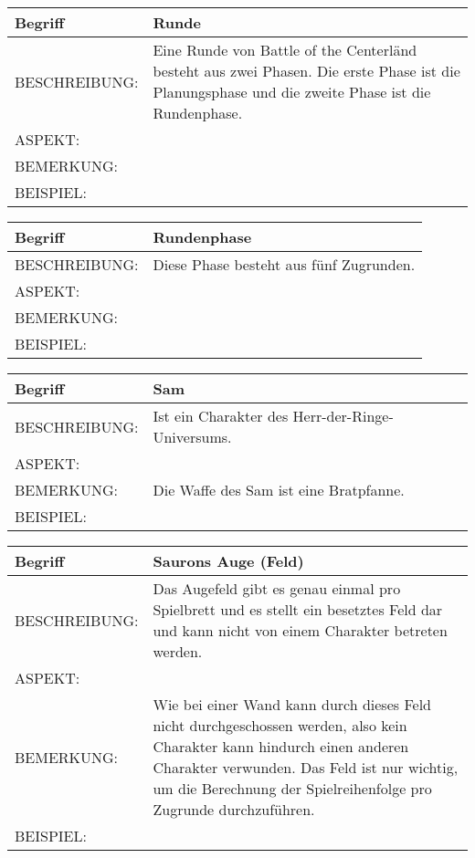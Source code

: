 \documentclass{uulm-assignment}
\begin{document}
	     \begin{tabularx}{\textwidth}{|l|X |} \hline
	        \textbf{Begriff} & \textbf{Runde} \\
	        \hline
	        BESCHREIBUNG: & Eine Runde von Battle of the Centerländ besteht aus zwei Phasen. Die erste Phase ist die Planungsphase und die zweite Phase ist die Rundenphase. \\
	        \hline
	        ASPEKT: &
	        \\
	        \hline
	        BEMERKUNG: &  \\
	        \hline
	        BEISPIEL: & \\
	        \hline
	    \end{tabularx}

	     \begin{tabularx}{\textwidth}{|l|X |} \hline
	        \textbf{Begriff} & \textbf{Rundenphase} \\
	        \hline
	        BESCHREIBUNG: & Diese Phase besteht aus fünf Zugrunden.  \\
	        \hline
	        ASPEKT: &
	        \\
	        \hline
	        BEMERKUNG: &  \\
	        \hline
	        BEISPIEL: & \\
	        \hline
	    \end{tabularx}

	     \begin{tabularx}{\textwidth}{|l|X |} \hline
	        \textbf{Begriff} & \textbf{Sam} \\
	        \hline
	        BESCHREIBUNG: & Ist ein Charakter des Herr-der-Ringe-Universums. \\
	        \hline
	        ASPEKT: &
	        \\
	        \hline
	        BEMERKUNG: & Die Waffe des Sam ist eine Bratpfanne. \\
	        \hline
	        BEISPIEL: & \\
	        \hline
	    \end{tabularx}

	     \begin{tabularx}{\textwidth}{|l|X |} \hline
	        \textbf{Begriff} & \textbf{Saurons Auge (Feld)} \\
	        \hline
	        BESCHREIBUNG: & Das Augefeld gibt es genau einmal pro Spielbrett und es stellt ein besetztes Feld dar und kann nicht von einem Charakter betreten werden. \\
	        \hline
	        ASPEKT: &
	        \\
	        \hline
	        BEMERKUNG: & Wie bei einer Wand kann durch dieses Feld nicht durchgeschossen werden, also kein Charakter kann hindurch einen anderen Charakter verwunden. Das Feld ist nur wichtig, um die Berechnung der Spielreihenfolge pro Zugrunde durchzuführen. \\
	        \hline
	        BEISPIEL: & \\
	        \hline
	    \end{tabularx}
\end{document}
